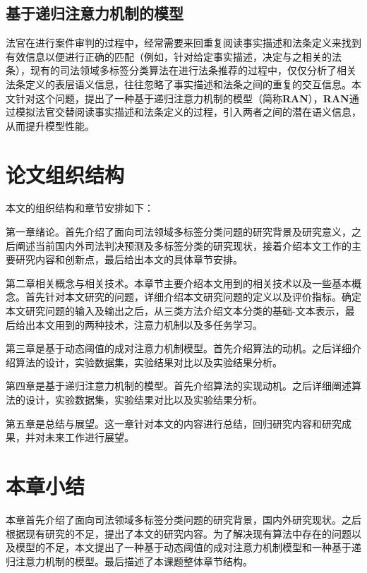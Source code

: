 \subsection{基于递归注意力机制的模型}
法官在进行案件审判的过程中，经常需要来回重复阅读事实描述和法条定义来找到有效信息以便进行正确的匹配（例如，针对给定事实描述，决定与之相关的法条），现有的司法领域多标签分类算法在进行法条推荐的过程中，仅仅分析了相关法条定义的表层语义信息，往往忽略了事实描述和法条之间的重复的交互信息。本文针对这个问题，提出了一种基于递归注意力机制的模型（简称\textbf{RAN}），\textbf{RAN}通过模拟法官交替阅读事实描述和法条定义的过程，引入两者之间的潜在语义信息，从而提升模型性能。
\section{论文组织结构}
本文的组织结构和章节安排如下：

第一章绪论。首先介绍了面向司法领域多标签分类问题的研究背景及研究意义，之后阐述当前国内外司法判决预测及多标签分类的研究现状，接着介绍本文工作的主要研究内容和创新点，最后给出本文的具体章节安排。

第二章相关概念与相关技术。本章节主要介绍本文用到的相关技术以及一些基本概念。首先针对本文研究的问题，详细介绍本文研究问题的定义以及评价指标。确定本文研究问题的输入及输出之后，从三类方法介绍文本分类的基础-文本表示，最后给出本文用到的两种技术，注意力机制以及多任务学习。

第三章是基于动态阈值的成对注意力机制模型。首先介绍算法的动机。之后详细介绍算法的设计，实验数据集，实验结果对比以及实验结果分析。

第四章是基于递归注意力机制的模型。首先介绍算法的实现动机。之后详细阐述算法的设计，实验数据集，实验结果对比以及实验结果分析。

第五章是总结与展望。这一章针对本文的内容进行总结，回归研究内容和研究成果，并对未来工作进行展望。


\section{本章小结}
本章首先介绍了面向司法领域多标签分类问题的研究背景，国内外研究现状。之后根据现有研究的不足，提出了本文的研究内容。为了解决现有算法中存在的问题以及模型的不足，本文提出了一种基于动态阈值的成对注意力机制模型和一种基于递归注意力机制的模型。最后描述了本课题整体章节结构。


